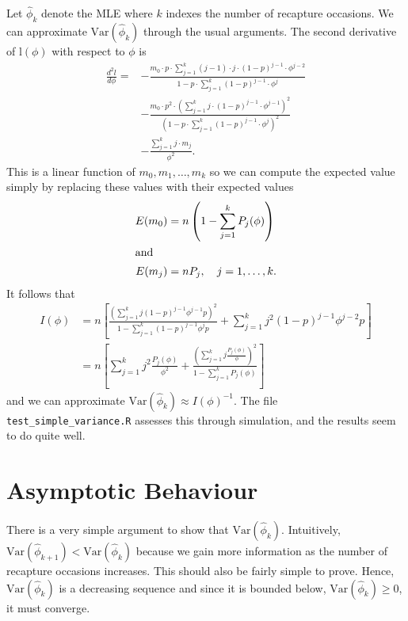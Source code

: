 \documentclass[12pt]{article}
\begin{document}
Let $\hat{\phi}_k$ denote the MLE where $k$ indexes the number of recapture occasions. We can approximate $\mathrm{Var}(\hat{\phi}_k)$ through the usual arguments. The second derivative of $\mathrm{l}(\phi)$ with respect to $\phi$ is
\begin{align*}
\frac{d^2l}{d\phi}=&-\frac{{{m}_{0}}\cdot p\cdot \sum_{j=1}^{k}\left( j-1\right) \cdot j\cdot {{\left( 1-p\right) }^{j-1}}\cdot {{\phi}^{j-2}}}{1-p\cdot \sum_{j=1}^{k}{{\left( 1-p\right) }^{j-1}}\cdot {{\phi}^{j}}}\\
&-\frac{{{m}_{0}}\cdot {{p}^{2}}\cdot {{\left( \sum_{j=1}^{k}j\cdot {{\left( 1-p\right) }^{j-1}}\cdot {{\phi}^{j-1}}\right) }^{2}}}{{{\left( 1-p\cdot \sum_{j=1}^{k}{{\left( 1-p\right) }^{j-1}}\cdot {{\phi}^{j}}\right) }^{2}}}\\
&-\frac{\sum_{j=1}^{k}j\cdot {{m}_{j}}}{{{\phi}^{2}}}.
\end{align*}
This is a linear function of $m_0,m_1,\ldots,m_k$ so we can compute the expected value simply by replacing these values with their expected values
\begin{align*}
  E(m_0)&=n\left(1-\sum_{j=1}^k P_j(\phi)\right)\\
\intertext{and}
  E(m_j)&=nP_j, \quad j=1,\ldots,k.
\end{align*}
It follows that 
\begin{align*}
I(\phi)&=n\left[\frac{{{\left( \sum_{j=1}^{k}j {{\left( 1-p\right) }^{j-1}} {{\phi}^{j-1}p}\right) }^{2}}}{1-\sum_{j=1}^{k}{{\left( 1-p\right) }^{j-1}} {{\phi}^{j}}p}+\sum_{j=1}^{k}{{j}^{2}} {{\left( 1-p\right) }^{j-1}} {{\phi}^{j-2}p}
\right]\\
  &=n\left[\sum_{j=1}^k j^2\frac{P_j(\phi)}{\phi^2} + \frac{\left(\sum_{j=1}^k j\frac{P_j(\phi)}{\phi}\right)^2}{1-\sum_{j=1}^k P_j(\phi)}\right]
\end{align*}
and we can approximate $\mathrm{Var}(\hat{\phi}_k) \approx I(\phi)^{-1}$. The file \texttt{test\_simple\_variance.R} assesses this through simulation, and the results seem to do quite well.


\section{Asymptotic Behaviour}

There is a very simple argument to show that $\mathrm{Var}(\hat{\phi}_k)$. Intuitively, $\mathrm{Var}(\hat{\phi}_{k+1})<\mathrm{Var}(\hat{\phi}_k)$ because we gain more information as the number of recapture occasions increases. This should also be fairly simple to prove. Hence, $\mathrm{Var}(\hat{\phi}_k)$ is a decreasing sequence and since it is bounded below, $\mathrm{Var}(\hat{\phi}_k) \geq 0$, it must converge.
\end{document}
